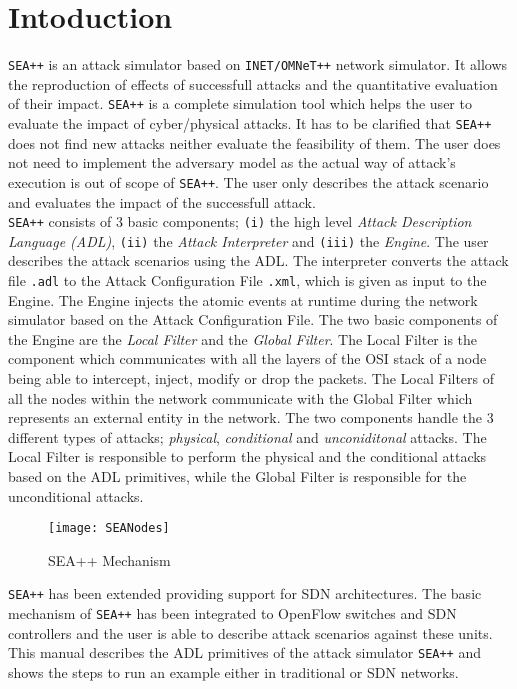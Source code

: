 

\chapter{Intoduction}
\label{ch:intro}

\texttt{SEA++} is an attack simulator based on \texttt{INET/OMNeT++} network simulator. It allows the reproduction of effects of successfull attacks and the quantitative evaluation of their impact. \texttt{SEA++} is a complete simulation tool which helps the user to evaluate the impact of cyber/physical attacks.  It has to be clarified that \texttt{SEA++} does not find new attacks neither evaluate the feasibility of them. The user does not need to implement the adversary model as the actual way of attack's execution is out of scope of \texttt{SEA++}. The user only describes the attack scenario and evaluates the impact of the successfull attack. \\

\texttt{SEA++} consists of 3 basic components; \texttt{(i)} the high level \emph{Attack Description Language (ADL)}, \texttt{(ii)} the \emph{Attack Interpreter} and \texttt{(iii)} the \emph{Engine}. The user describes the attack scenarios using the ADL. The interpreter converts the attack file \texttt{.adl} to the Attack Configuration File \texttt{.xml}, which is given as input to the Engine. The Engine injects the atomic events at runtime during the network simulator based on the Attack Configuration File. The two basic components of the Engine are the \emph{Local Filter} and the \emph{Global Filter}. The Local Filter is the component which communicates with all the layers of the OSI stack of a node being able to intercept, inject, modify or drop the packets. The Local Filters of all the nodes within the network communicate with the Global Filter which represents an external entity in the network. The two components handle the 3 different types of attacks; \emph{physical}, \emph{conditional} and \emph{unconiditonal} attacks. The Local Filter is responsible to perform the physical and the conditional attacks based on the ADL primitives, while the Global Filter is responsible for the unconditional attacks. \\

\begin{figure}[h]
\texttt{[image: SEANodes]}
\caption{SEA++ Mechanism}
\label{img:seaNodes}
\end{figure}

\texttt{SEA++} has been extended providing support for SDN architectures. The basic mechanism of \texttt{SEA++} has been integrated to OpenFlow switches and SDN controllers and the user is able to describe attack scenarios against these units. This manual describes the ADL primitives of the attack simulator \texttt{SEA++} and shows the steps to run an example either in traditional or SDN networks.
